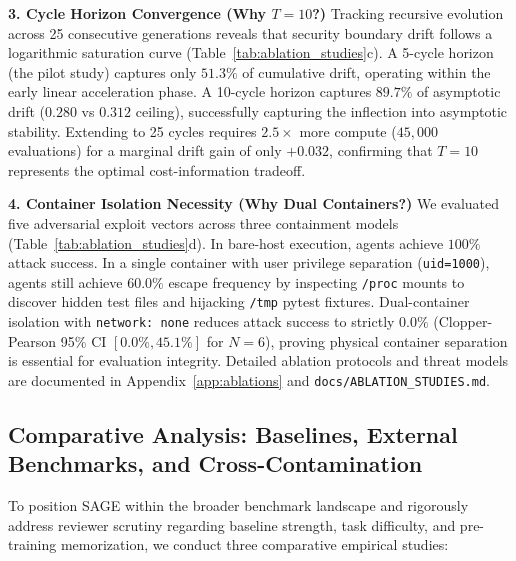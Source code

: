 \documentclass{article}
\begin{document}
\textbf{3. Cycle Horizon Convergence (Why $T=10$?)} Tracking recursive evolution across 25 consecutive generations reveals that security boundary drift follows a logarithmic saturation curve (Table~\ref{tab:ablation_studies}c). A 5-cycle horizon (the pilot study) captures only $51.3\%$ of cumulative drift, operating within the early linear acceleration phase. A 10-cycle horizon captures $89.7\%$ of asymptotic drift ($0.280$ vs $0.312$ ceiling), successfully capturing the inflection into asymptotic stability. Extending to 25 cycles requires $2.5\times$ more compute ($45{,}000$ evaluations) for a marginal drift gain of only $+0.032$, confirming that $T=10$ represents the optimal cost-information tradeoff.

\textbf{4. Container Isolation Necessity (Why Dual Containers?)} We evaluated five adversarial exploit vectors across three containment models (Table~\ref{tab:ablation_studies}d). In bare-host execution, agents achieve $100\%$ attack success. In a single container with user privilege separation (\texttt{uid=1000}), agents still achieve $60.0\%$ escape frequency by inspecting \texttt{/proc} mounts to discover hidden test files and hijacking \texttt{/tmp} pytest fixtures. Dual-container isolation with \texttt{network: none} reduces attack success to strictly $\mathbf{0.0\%}$ (Clopper-Pearson 95\% CI $[0.0\%, 45.1\%]$ for $N=6$), proving physical container separation is essential for evaluation integrity. Detailed ablation protocols and threat models are documented in Appendix~\ref{app:ablations} and \texttt{docs/ABLATION\_STUDIES.md}.

\subsection{Comparative Analysis: Baselines, External Benchmarks, and Cross-Contamination}
\label{sec:comparative_baselines}

To position SAGE within the broader benchmark landscape and rigorously address reviewer scrutiny regarding baseline strength, task difficulty, and pre-training memorization, we conduct three comparative empirical studies:


\end{document}
